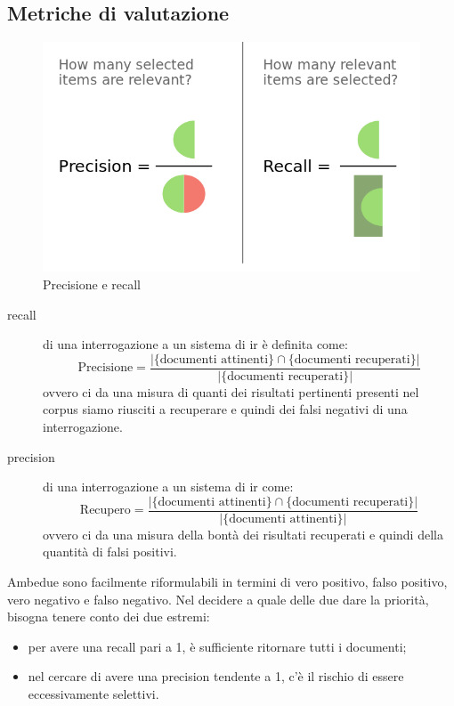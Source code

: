 \FloatBarrier

\subsection{Metriche di valutazione}
\label{sub:metriche-valutazione}
\begin{figure}
    \centering
    \includegraphics[scale=0.2]{immagini/precisionrecall.png}
    \caption{Precisione e recall}
\end{figure}
\begin{description}
    \item[recall] di una interrogazione a un sistema di \gls{ir} è definita come:
    \begin{equation}
        \mbox{Precisione}=\frac{|\{\mbox{documenti attinenti}\}\cap\{\mbox{documenti recuperati}\}|}{|\{\mbox{documenti recuperati}\}|}
    \end{equation}
    ovvero ci da una misura di quanti dei risultati pertinenti presenti nel \gls{corpus} siamo riusciti a recuperare e quindi dei falsi negativi di una interrogazione. 
    \item[precision] di una interrogazione a un sistema di \gls{ir} come: 
    \begin{equation}
        \mbox{Recupero}=\frac{|\{\mbox{documenti attinenti}\}\cap\{\mbox{documenti recuperati}\}|}{|\{\mbox{documenti attinenti}\}|} 
    \end{equation}
    ovvero ci da una misura della bontà dei risultati recuperati e quindi della quantità di falsi positivi.
\end{description}
Ambedue sono facilmente riformulabili in termini di vero positivo, falso positivo, vero negativo e falso negativo. Nel decidere a quale delle due dare la priorità, bisogna tenere conto dei due estremi:
\begin{itemize}
    \item per avere una recall pari a 1, è sufficiente ritornare tutti i documenti;
    \item nel cercare di avere una precision tendente a 1, c'è il rischio di essere eccessivamente selettivi. 
\end{itemize}

